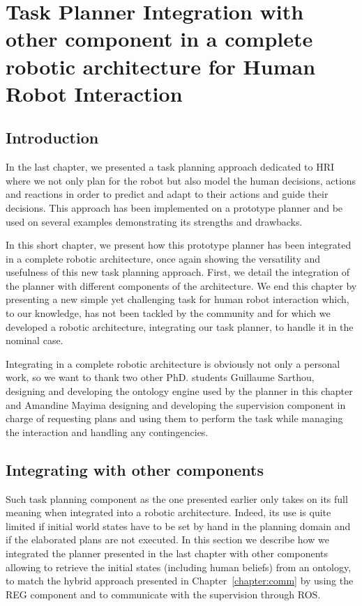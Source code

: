 \documentclass[a4paper,11pt,twoside]{StyleThese}
\begin{document}
\setcounter{chapter}{4} %
\dominitoc
\faketableofcontents
\fi

\chapter{Task Planner Integration with other component in a complete robotic architecture for Human Robot Interaction}
\label{chapter:integration}
\minitoc

\section{Introduction}
In the last chapter, we presented a task planning approach dedicated to HRI where we not only plan for the robot but also model the human decisions, actions and reactions in order to predict and adapt to their actions and guide their decisions. This approach has been implemented on a prototype planner and be used on several examples demonstrating its strengths and drawbacks.

In this short chapter, we present how this prototype planner has been integrated in a complete robotic architecture, once again showing the versatility and usefulness of this new task planning approach. First, we detail the integration of the planner with different components of the architecture. We end this chapter by presenting a new simple yet challenging task for human robot interaction which, to our knowledge, has not been tackled by the community and for which we developed a robotic architecture, integrating our task planner, to handle it in the nominal case.

Integrating in a complete robotic architecture is obviously not only a personal work, so we want to thank two other PhD. students Guillaume Sarthou, designing and developing the ontology engine used by the planner in this chapter and Amandine Mayima designing and developing the supervision component in charge of requesting plans and using them to perform the task while managing the interaction and handling any contingencies.

\section{Integrating with other components}
\label{sec:chap5integratingwithothers}

Such task planning component as the one presented earlier only takes on its full meaning when integrated into a robotic architecture. Indeed, its use is quite limited if initial world states have to be set by hand in the planning domain and if the elaborated plans are not executed. In this section we describe how we integrated the planner presented in the last chapter with other components allowing to retrieve the initial states (including human beliefs) from an ontology, to match the hybrid approach presented in Chapter~\ref{chapter:comm} by using the REG component and to communicate with the supervision through ROS.
\end{document}
